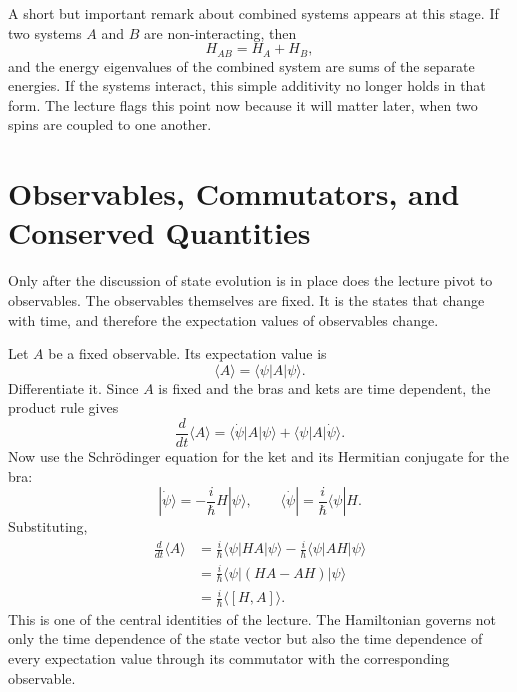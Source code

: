 A short but important remark about combined systems appears at this stage. If two systems \(A\) and \(B\) are non-interacting, then
\begin{equation}
H_{AB}=H_A+H_B,
\end{equation}
and the energy eigenvalues of the combined system are sums of the separate energies. If the systems interact, this simple additivity no longer holds in that form. The lecture flags this point now because it will matter later, when two spins are coupled to one another.

\section{Observables, Commutators, and Conserved Quantities}

Only after the discussion of state evolution is in place does the lecture pivot to observables. The observables themselves are fixed. It is the states that change with time, and therefore the expectation values of observables change.

Let \(A\) be a fixed observable. Its expectation value is
\begin{equation}
\langle A\rangle=\langle \psi|A|\psi\rangle.
\end{equation}
Differentiate it. Since \(A\) is fixed and the bras and kets are time dependent, the product rule gives
\begin{equation}
\frac{d}{dt}\langle A\rangle
=
\langle \dot\psi|A|\psi\rangle
+
\langle \psi|A|\dot\psi\rangle.
\end{equation}
Now use the Schrödinger equation for the ket and its Hermitian conjugate for the bra:
\begin{equation}
|\dot\psi\rangle=-\frac{i}{\hbar}H|\psi\rangle,
\qquad
\langle \dot\psi|=\frac{i}{\hbar}\langle \psi|H.
\end{equation}
Substituting,
\begin{align}
\frac{d}{dt}\langle A\rangle
&=
\frac{i}{\hbar}\langle \psi|HA|\psi\rangle
-
\frac{i}{\hbar}\langle \psi|AH|\psi\rangle \\
&=
\frac{i}{\hbar}\langle \psi|(HA-AH)|\psi\rangle \\
&=
\frac{i}{\hbar}\langle [H,A]\rangle.
\end{align}
This is one of the central identities of the lecture. The Hamiltonian governs not only the time dependence of the state vector but also the time dependence of every expectation value through its commutator with the corresponding observable.

